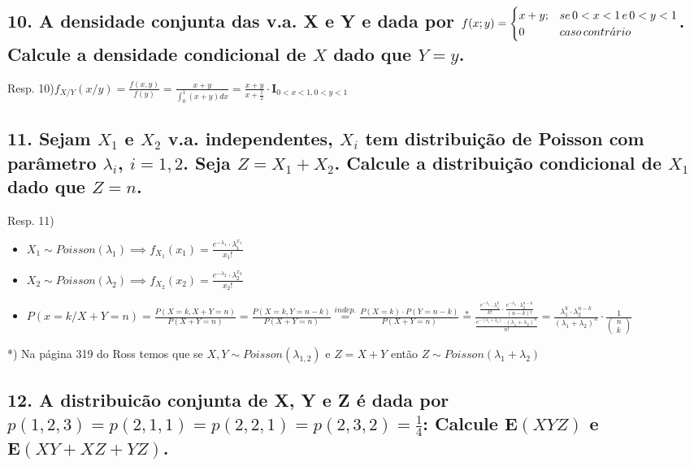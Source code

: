 \documentclass[portuguese]{article}
\begin{document}
\subsection*{\textmd{10. A densidade conjunta das v.a. X e Y e dada por $f(x;y)=\protect\begin{cases}
x+y; & se\,0<x<1\, e\,0<y<1\protect\\
0 & caso\, contr\acute{a}rio
\protect\end{cases}$. Calcule a densidade condicional de $X$ dado que $Y=y$. }}

Resp. 10)$f_{X/Y}(x/y)=\frac{f(x,y)}{f(y)}=\frac{x+y}{\int_{0}^{1}(x+y)dx}=\frac{x+y}{x+\frac{1}{2}}\cdot\mathbf{I}_{0<x<1,0<y<1}$


\subsection*{\textmd{11. Sejam $X_{1}$ e $X_{2}$ v.a. independentes, $X_{i}$
tem distribuição de Poisson com parâmetro $\lambda_{i}$, $i=1,2$.
Seja $Z=X_{1}+X_{2}$. Calcule a distribuição condicional de $X_{1}$
dado que $Z=n$. }}

Resp. 11)
\begin{itemize}
\item $X_{1}\sim Poisson(\lambda_{1})\implies f_{X_{1}}(x_{1})=\frac{e^{-\lambda_{1}}\cdot\lambda_{1}^{x_{1}}}{x_{1}!}$
\item $X_{2}\sim Poisson(\lambda_{2})\implies f_{X_{2}}(x_{2})=\frac{e^{-\lambda_{2}}\cdot\lambda_{2}^{x_{2}}}{x_{2}!}$
\item $P(x=k/X+Y=n)=\frac{P(X=k,X+Y=n)}{P(X+Y=n)}=\frac{P(X=k,Y=n-k)}{P(X+Y=n)}\overset{indep.}{=}\frac{P(X=k)\cdot P(Y=n-k)}{P(X+Y=n)}\overset{*}{=}\frac{\frac{e^{-\lambda_{1}}\cdot\lambda_{1}^{k}}{k!}\cdot\frac{e^{-\lambda_{2}}\cdot\lambda_{2}^{n-k}}{(n-k)!}}{\frac{e^{-(\lambda_{1}+\lambda_{2})}\cdot(\lambda_{1}+\lambda_{2})^{n}}{n!}}=\frac{\lambda_{1}^{k}\cdot\lambda_{2}^{n-k}}{(\lambda_{1}+\lambda_{2})^{n}}\cdot\frac{1}{\left(\begin{array}{c}
n\\
k
\end{array}\right)}$
\end{itemize}
{*}) Na página 319 do Ross temos que se $X,Y\sim Poisson(\lambda_{1,2})$
e $Z=X+Y$ então $Z\sim Poisson(\lambda_{1}+\lambda_{2})$


\subsection*{\textmd{12. A distribuicão conjunta de X, Y e Z é dada por $p(1,2,3)=p(2,1,1)=p(2,2,1)=p(2,3,2)=\frac{1}{4}$:
Calcule $\mathbf{E}(XYZ)$ e $\mathbf{E}(XY+XZ+YZ)$. }}
\end{document}
